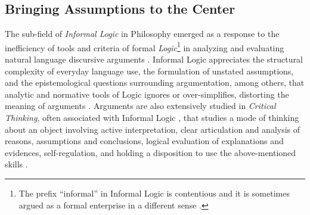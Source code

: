 

\subsection{Bringing Assumptions to the Center}
\label{rel:core}
The sub-field of \textit{Informal Logic} in Philosophy emerged as a response to the inefficiency of tools and criteria of formal \textit{Logic}\footnote{The prefix ``informal'' in Informal Logic is contentious and it is sometimes argued as a formal enterprise in a different sense \cite{woods2000philosophical,levi2000defense,johnson1999relation}.} in analyzing and evaluating natural language discursive arguments \cite{blair2012informal,walton2008informal,scriven1980philosophical,scriven1976reasoning}.
Informal Logic appreciates the structural complexity of everyday language use, the formulation of unstated assumptions, and the epistemological questions surrounding argumentation, among others, that analytic and normative tools of Logic ignores or over-simplifies, distorting the meaning of arguments \cite{anthony2015informal,johnson2014rise}. 
Arguments are also extensively studied in \textit{Critical Thinking}, often associated with Informal Logic \cite{weinstein1990towards,johnson2012informal,crews2007critical}, that studies a mode of thinking about an object involving active interpretation, clear articulation and analysis of reasons, assumptions and conclusions, logical evaluation of explanations and evidences, self-regulation, and holding a disposition to use the above-mentioned skills .

